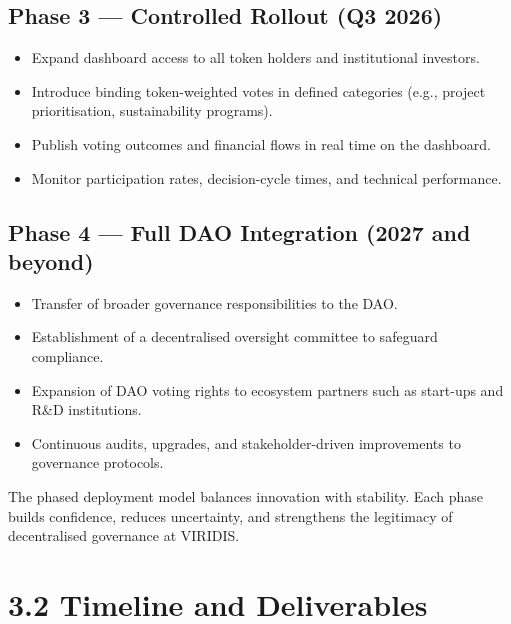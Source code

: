 \documentclass[
  english,
  12pt,
  oneside,
  open=any]{scrbook}
\providecommand{\tightlist}{%
  \setlength{\itemsep}{0pt}\setlength{\parskip}{0pt}}\usepackage{longtable,booktabs,array}
\begin{document}
\subsection{Phase 3 --- Controlled Rollout (Q3
2026)}\label{phase-3-controlled-rollout-q3-2026}

\begin{itemize}
\tightlist
\item
  Expand dashboard access to all token holders and institutional
  investors.\\
\item
  Introduce binding token-weighted votes in defined categories (e.g.,
  project prioritisation, sustainability programs).\\
\item
  Publish voting outcomes and financial flows in real time on the
  dashboard.\\
\item
  Monitor participation rates, decision-cycle times, and technical
  performance.
\end{itemize}

\subsection{Phase 4 --- Full DAO Integration (2027 and
beyond)}\label{phase-4-full-dao-integration-2027-and-beyond}

\begin{itemize}
\tightlist
\item
  Transfer of broader governance responsibilities to the DAO.\\
\item
  Establishment of a decentralised oversight committee to safeguard
  compliance.\\
\item
  Expansion of DAO voting rights to ecosystem partners such as start-ups
  and R\&D institutions.\\
\item
  Continuous audits, upgrades, and stakeholder-driven improvements to
  governance protocols.
\end{itemize}

The phased deployment model balances innovation with stability. Each
phase builds confidence, reduces uncertainty, and strengthens the
legitimacy of decentralised governance at VIRIDIS.

\section{3.2 Timeline and Deliverables}\label{sec-timeline}
\end{document}
